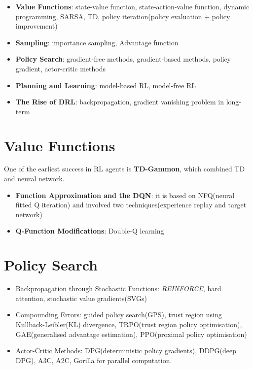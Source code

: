 \documentclass{article}
\begin{document}
\begin{itemize}
    \item \textbf{Value Functions}: state-value function, state-action-value function, dynamic programming, SARSA, TD, policy iteration(policy evaluation + policy improvement)
    \item \textbf{Sampling}: importance sampling, Advantage function
    \item \textbf{Policy Search}: gradient-free methods, gradient-based methods, policy gradient, actor-critic methods
    \item \textbf{Planning and Learning}: model-based RL, model-free RL
    \item \textbf{The Rise of DRL}: backpropagation, gradient vanishing problem in long-term
\end{itemize}

\section{Value Functions}
One of the earliest success in RL agents is \textbf{TD-Gammon}, which combined TD and neural network.

\begin{itemize}
    \item \textbf{Function Approximation and the DQN}: it is based on NFQ(neural fitted Q iteration) and involved two techniques(experience replay and target network)
    \item \textbf{Q-Function Modifications}: Double-Q learning
\end{itemize}

\section{Policy Search}
\begin{itemize}
    \item Backpropagation through Stochastic Functions: \textit{REINFORCE}, hard attention, stochastic value gradients(SVGs)
    \item Compounding Errors: guided policy search(GPS), trust region using Kullback-Leibler(KL) divergence, TRPO(trust region policy optimisation), GAE(generalised advantage estimation), PPO(proximal policy optimisation)
    \item Actor-Critic Methods: DPG(deterministic policy gradients), DDPG(deep DPG), A3C, A2C, Gorilla for parallel computation.
\end{itemize}
\end{document}
